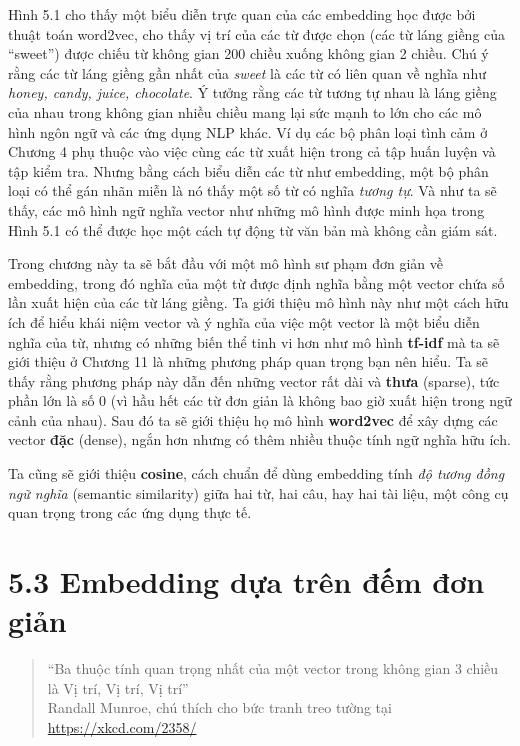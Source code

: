Hình 5.1 cho thấy một biểu diễn trực quan của các embedding học được bởi thuật toán word2vec, cho thấy vị trí của các từ được chọn (các từ láng giềng của ``sweet'') được chiếu từ không gian 200 chiều xuống không gian 2 chiều. Chú ý rằng các từ láng giềng gần nhất của \emph{sweet} là các từ có liên quan về nghĩa như \emph{honey, candy, juice, chocolate}. Ý tưởng rằng các từ tương tự nhau là láng giềng của nhau trong không gian nhiều chiều mang lại sức mạnh to lớn cho các mô hình ngôn ngữ và các ứng dụng NLP khác. Ví dụ các bộ phân loại tình cảm ở Chương 4 phụ thuộc vào việc cùng các từ xuất hiện trong cả tập huấn luyện và tập kiểm tra. Nhưng bằng cách biểu diễn các từ như embedding, một bộ phân loại có thể gán nhãn miễn là nó thấy một số từ có nghĩa \emph{tương tự}. Và như ta sẽ thấy, các mô hình ngữ nghĩa vector như những mô hình được minh họa trong Hình 5.1 có thể được học một cách tự động từ văn bản mà không cần giám sát.

Trong chương này ta sẽ bắt đầu với một mô hình sư phạm đơn giản về embedding, trong đó nghĩa của một từ được định nghĩa bằng một vector chứa số lần xuất hiện của các từ láng giềng. Ta giới thiệu mô hình này như một cách hữu ích để hiểu khái niệm vector và ý nghĩa của việc một vector là một biểu diễn nghĩa của từ, nhưng có những biến thể tinh vi hơn như mô hình \textbf{tf-idf} mà ta sẽ giới thiệu ở Chương 11 là những phương pháp quan trọng bạn nên hiểu. Ta sẽ thấy rằng phương pháp này dẫn đến những vector rất dài và \textbf{thưa} (sparse), tức phần lớn là số 0 (vì hầu hết các từ đơn giản là không bao giờ xuất hiện trong ngữ cảnh của nhau). Sau đó ta sẽ giới thiệu họ mô hình \textbf{word2vec} để xây dựng các vector \textbf{đặc} (dense), ngắn hơn nhưng có thêm nhiều thuộc tính ngữ nghĩa hữu ích.

Ta cũng sẽ giới thiệu \textbf{cosine}, cách chuẩn để dùng embedding tính \emph{độ tương đồng ngữ nghĩa} (semantic similarity) giữa hai từ, hai câu, hay hai tài liệu, một công cụ quan trọng trong các ứng dụng thực tế.

\section{5.3 Embedding dựa trên đếm đơn giản}

\begin{quote}
``Ba thuộc tính quan trọng nhất của một vector trong không gian 3 chiều là {Vị trí, Vị trí, Vị trí}'' \\
Randall Munroe, chú thích cho bức tranh treo tường tại \url{https://xkcd.com/2358/}
\end{quote}

